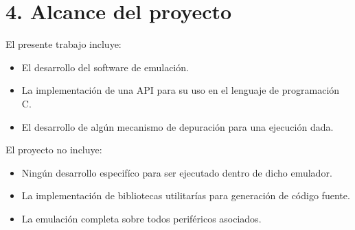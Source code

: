 \section{4. Alcance del proyecto}
\label{sec:alcance}

El presente trabajo incluye:

\begin{itemize}
\item El desarrollo del software de emulación.
\item La implementación de una API para su uso en el lenguaje de programación C.
\item El desarrollo de algún mecanismo de depuración para una ejecución dada.
\end{itemize}

El proyecto no incluye:

\begin{itemize}
\item Ningún desarrollo especifíco para ser ejecutado dentro de dicho emulador.
\item La implementación de bibliotecas utilitarías para generación de código fuente.
\item La emulación completa sobre todos periféricos asociados.
\end{itemize}

